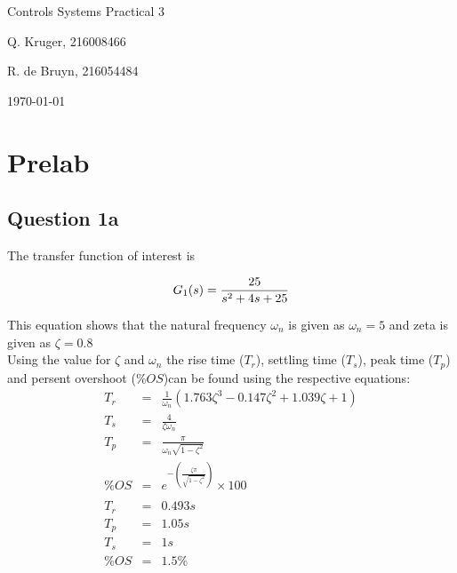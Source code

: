 \documentclass[12pt, a4paper]{article}
\begin{document}
		\begin{titlepage}
			\centering
			{\LARGE Controls Systems Practical 3 \par}
			\vspace*{1.5cm}
			{\large Q. Kruger, 216008466 \par}
			{\large R. de Bruyn, 216054484 \par}
			\vspace*{1.2cm}
			{\large \today}
			\vspace*{\fill}
			\vspace*{\fill}
		\end{titlepage}

		\tableofcontents
		\listoffigures
		\listoftables
		\newpage

	\section{Prelab} %
	\label{sec:prelab}
		\subsection{Question 1a} %
		\label{sub:question_1a}
		The transfer function of interest is 

		\begin{equation}
			\label{eqn:G_1}
			G_1(s) =\frac{25}{s^2 +4s+25} \\
		\end{equation}
				
	
		This equation shows that the natural frequency $\omega_n$ is given as $\omega_n = 5$ and zeta is given as $\zeta = 0.8$\\ 

		Using the value for $\zeta$ and $\omega_n$ the rise time ($T_r$), settling time ($T_s$), peak time ($T_p$) and persent overshoot ($\%OS$)can be found using the respective equations:
		\[
			\begin{array}{rcl}

				T_r &=& \frac{1}{\omega_n}(1.763\zeta^3-0.147\zeta^2+1.039\zeta+1)\\
				T_s &=& \frac{4}{\zeta\omega_n}\\
				T_p &=& \frac{\pi}{\omega_n\sqrt{1-\zeta^2}}\\
				\%OS &=& e^{-(\frac{\zeta\pi}{\sqrt{1-\zeta^2}})} \times 100\\
				\\
				T_r &=& 0.493 s \\
				T_p &=& 1.05 s\\
				T_s &=& 1 s\\
				\%OS &=& 1.5 \%\\
			\end{array}
		\]
\end{document}
